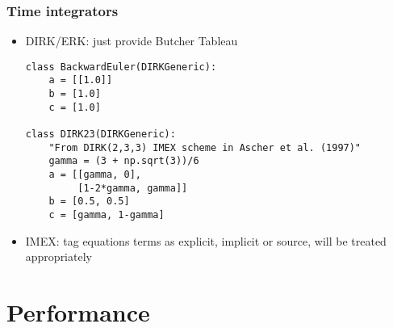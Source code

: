 \documentclass{beamer}
\begin{document}
\begin{frame}[fragile]
  \frametitle{Time integrators}
  \begin{itemize}
  \item DIRK/ERK: just provide Butcher Tableau
\begin{verbatim}
class BackwardEuler(DIRKGeneric):
    a = [[1.0]]
    b = [1.0]
    c = [1.0]

class DIRK23(DIRKGeneric):
    "From DIRK(2,3,3) IMEX scheme in Ascher et al. (1997)"
    gamma = (3 + np.sqrt(3))/6
    a = [[gamma, 0],
         [1-2*gamma, gamma]]
    b = [0.5, 0.5]
    c = [gamma, 1-gamma]
\end{verbatim}
  \item IMEX: tag equations terms as explicit, implicit or source,
    will be treated appropriately
  \end{itemize}
\end{frame}
\section{Performance}
\end{document}
